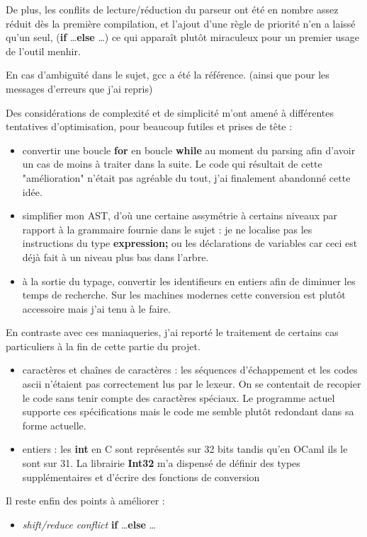 \documentclass[a4paper]{article}
\begin{document}
De plus, les conflits de lecture/réduction du parseur ont été en nombre
assez réduit dès la première compilation, et l'ajout d'une règle de
priorité n'en a laissé qu'un seul, ({\bf if} \dots {\bf else} \dots) 
ce qui apparaît plutôt miraculeux pour un premier usage de l'outil
menhir.

En cas d'ambiguïté dans le sujet, gcc a été la référence. (ainsi que pour
les messages d'erreurs que j'ai repris)

Des considérations de complexité et de simplicité m'ont amené à 
différentes tentatives d'optimisation, pour beaucoup futiles et prises de
tête :

\begin{itemize}
  \item convertir une boucle {\bf for} en boucle {\bf while} au moment du
parsing afin d'avoir un cas de moins à traiter dans la suite. Le code qui
résultait de cette "amélioration" n'était pas agréable du tout, j'ai
finalement abandonné cette idée.
  \item simplifier mon AST, d'où une certaine assymétrie à certains
niveaux par rapport à la grammaire fournie dans le sujet : je ne localise
pas les instructions du type {\bf expression;} ou les déclarations de
variables car ceci est déjà fait à un niveau plus bas dans l'arbre.
  \item à la sortie du typage, convertir les identifieurs en entiers
afin de diminuer les temps de recherche. Sur les machines modernes cette
conversion est plutôt accessoire mais j'ai tenu à le faire. 
\end{itemize}

En contraste avec ces maniaqueries, j'ai reporté le traitement de
certains cas particuliers à la fin de cette partie du projet.

\begin{itemize}
  \item caractères et chaînes de caractères : les séquences
d'échappement et les codes ascii n'étaient pas correctement lus par le
lexeur. On se contentait de recopier le code sans tenir compte des
caractères spéciaux. Le programme actuel supporte ces spécifications mais
le code me semble plutôt redondant dans sa forme actuelle.
  \item entiers : les {\bf int} en C sont représentés sur 32 bits tandis
qu'en OCaml ils le sont sur 31. La librairie {\bf Int32} m'a dispensé de
définir des types supplémentaires et d'écrire des fonctions de conversion 
\end{itemize}

Il reste enfin des points à améliorer :

\begin{itemize}
  \item {\it shift/reduce conflict} {\bf if} \dots {\bf else} \dots
\end{itemize}
\end{document}
